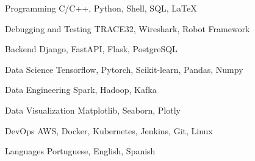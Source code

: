 

\begin{cvskills}

  \cvskill
    {Programming} %
    {C/C++, Python, Shell, SQL, LaTeX} %

  \cvskill
    {Debugging and Testing} %
    {TRACE32, Wireshark, Robot Framework} %

  \cvskill
    {Backend} %
    {Django, FastAPI, Flask, PostgreSQL} %

  \cvskill
    {Data Science} %
    {Tensorflow, Pytorch, Scikit-learn, Pandas, Numpy} %

  \cvskill
    {Data Engineering} %
    {Spark, Hadoop, Kafka} %

  \cvskill
    {Data Visualization} %
    {Matplotlib, Seaborn, Plotly} %

  \cvskill
    {DevOps} %
    {AWS, Docker, Kubernetes, Jenkins, Git, Linux} %
    

  \cvskill
    {Languages} %
    {Portuguese, English, Spanish} %
    
\end{cvskills}
